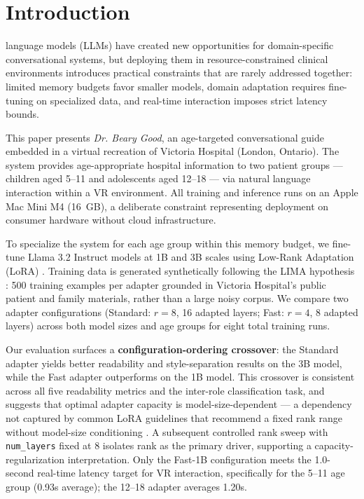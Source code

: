 \documentclass[journal]{IEEEtai}
\begin{document}
\section{Introduction}

 language models (LLMs) have created new opportunities for domain-specific conversational systems, but deploying them in resource-constrained clinical environments introduces practical constraints that are rarely addressed together: limited memory budgets favor smaller models, domain adaptation requires fine-tuning on specialized data, and real-time interaction imposes strict latency bounds.

This paper presents \textit{Dr. Beary Good}, an age-targeted conversational guide embedded in a virtual recreation of Victoria Hospital (London, Ontario). The system provides age-appropriate hospital information to two patient groups --- children aged 5--11 and adolescents aged 12--18 --- via natural language interaction within a VR environment. All training and inference runs on an Apple Mac Mini M4 (16~GB), a deliberate constraint representing deployment on consumer hardware without cloud infrastructure.

To specialize the system for each age group within this memory budget, we fine-tune Llama 3.2 Instruct models \cite{dubey2024llama3} at 1B and 3B scales using Low-Rank Adaptation (LoRA) \cite{hu2022lora}. Training data is generated synthetically following the LIMA hypothesis \cite{zhou2023lima}: 500 training examples per adapter grounded in Victoria Hospital's public patient and family materials, rather than a large noisy corpus. We compare two adapter configurations (Standard: $r = 8$, 16 adapted layers; Fast: $r = 4$, 8 adapted layers) across both model sizes and age groups for eight total training runs.

Our evaluation surfaces a \textbf{configuration-ordering crossover}: the Standard adapter yields better readability and style-separation results on the 3B model, while the Fast adapter outperforms on the 1B model. This crossover is consistent across all five readability metrics and the inter-role classification task, and suggests that optimal adapter capacity is model-size-dependent --- a dependency not captured by common LoRA guidelines that recommend a fixed rank range without model-size conditioning \cite{biderman2024lora}. A subsequent controlled rank sweep with \texttt{num\_layers} fixed at 8 isolates rank as the primary driver, supporting a capacity-regularization interpretation. Only the Fast-1B configuration meets the 1.0-second real-time latency target for VR interaction, specifically for the 5--11 age group (0.93s average); the 12--18 adapter averages 1.20s.
\end{document}
